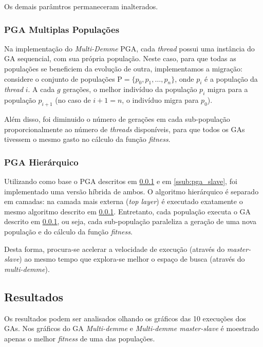 \documentclass[12pt]{article}
\begin{document}
Os demais parâmtros permaneceram inalterados.


\subsubsection{PGA Multiplas Populações} %
\label{ssub:pga_mp}

Na implementação do \emph{Multi-Demme} PGA, cada \emph{thread} possui uma instância do GA sequencial, com sua própria população. Neste caso, para que todas as populações se beneficiem da evolução de outra, implementamos a migração: considere o conjunto de populações $\mathrm{P} = \lbrace p_0, p_1, \dots, p_n \rbrace$, onde $p_i$ é a população da \emph{thread} $i$. A cada $g$ gerações, o melhor indivíduo da população $p_i$ migra para a população $p_{i+1}$ (no caso de $i+1 = n$, o indivíduo migra para $p_0$).

Além disso, foi diminuido o número de gerações em cada sub-população proporcionalmente ao número de \emph{threads} disponíveis, para que todos os GAs tivessem o mesmo gasto no cálculo da função \emph{fitness}.


\subsubsection{PGA Hierárquico} %
\label{ssub:pga_h}

Utilizando como base o PGA descritos em \ref{ssub:pga_mp} e em \ref{ssub:pga_slave}, foi implementado uma versão híbrida de ambos. O algoritmo hierárquico é separado em camadas: na camada mais externa (\emph{top layer}) é executado exatamente o mesmo algoritmo descrito em \ref{ssub:pga_mp}. Entretanto, cada população executa o GA descrito em \ref{ssub:pga_mp}, ou seja, cada sub-população paraleliza a geração de uma nova população e do cálculo da função \emph{fitness}.

Desta forma, procura-se acelerar a velocidade de execução (através do \emph{master-slave}) ao mesmo tempo que explora-se melhor o espaço de busca (através do \emph{multi-demme}).

\subsection{Resultados} %
\label{sub:resultados}

Os resultados podem ser analisados olhando os gráficos das 10 execuções dos GAs. Nos gráficos do GA \emph{Multi-demme} e \emph{Multi-demme master-slave} é moestrado apenas o melhor \emph{fitness} de uma das populações.
\end{document}
